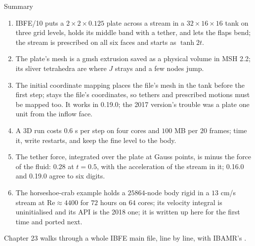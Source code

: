 \documentclass[aspectratio=169,11pt]{beamer}
\begin{document}
\begin{frame}{Summary}
\label{fr:summary}
\footnotesize
\begin{enumerate}
  \item IBFE/10 puts a $2\times2\times0.125$ plate across a stream in a $32\times16\times16$ tank on three grid levels, holds its middle band with a tether, and lets the flaps bend; the stream is prescribed on all six faces and starts as $\tanh 2t$.
  \item The plate's mesh is a gmsh extrusion saved as a physical volume in MSH 2.2; its sliver tetrahedra are where $J$ strays and a few nodes jump.
  \item The initial coordinate mapping places the file's mesh in the tank before the first step;  stays the file's coordinates, so tethers and prescribed motions must be mapped too. It works in 0.19.0; the 2017 version's trouble was a plate one unit from the inflow face.
  \item A 3D run costs $0.6$ s per step on four cores and $100$ MB per $20$ frames; time it, write restarts, and keep the fine level to the body.
  \item The tether force, integrated over the plate at Gauss points, is minus the force of the fluid: $0.28$ at $t = 0.5$, with the acceleration of the stream in it; 0.16.0 and 0.19.0 agree to six digits.
  \item The horseshoe-crab example holds a $25864$-node body rigid in a $13$ cm/s stream at $\mathrm{Re} \approx 4400$ for $72$ hours on $64$ cores; its velocity integral is uninitialised and its API is the 2018 one; it is written up here for the first time and ported next.
\end{enumerate}
\begin{homebox}
\footnotesize Chapter 23 walks through a whole IBFE main file, line by line, with IBAMR's .
\end{homebox}
\end{frame}
\end{document}
